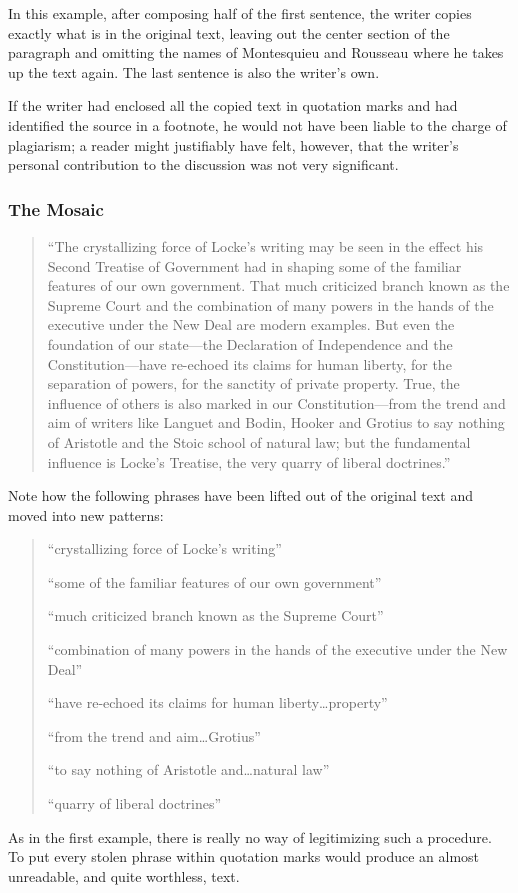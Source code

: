 In this example, after composing half of the first sentence, the writer copies exactly what is in the original text, leaving out the center section of the paragraph and omitting the names of Montesquieu and Rousseau where he takes up the text again. The last sentence is also the writer’s own.

If the writer had enclosed all the copied text in quotation marks and had identified the source in a footnote, he would not have been liable to the charge of plagiarism; a reader might justifiably have felt, however, that the writer’s personal contribution to the discussion was not very significant.

\subsubsection{The Mosaic}

\begin{quote}“The crystallizing force of Locke’s writing may be seen in the effect his Second Treatise of Government had in shaping some of the familiar features of our own government. That much criticized branch known as the Supreme Court and the combination of many powers in the hands of the executive under the New Deal are modern examples. But even the foundation of our state—the Declaration of Independence and the Constitution—have re-echoed its claims for human liberty, for the separation of powers, for the sanctity of private property. True, the influence of others is also marked in our Constitution—from the trend and aim of writers like Languet and Bodin, Hooker and Grotius to say nothing of Aristotle and the Stoic school of natural law; but the fundamental influence is Locke’s Treatise, the very quarry of liberal doctrines.”
\end{quote}

Note how the following phrases have been lifted out of the original text and moved into new patterns:
\begin{quote}
“crystallizing force of Locke’s writing”

“some of the familiar features of our own government”

“much criticized branch known as the Supreme Court”

“combination of many powers in the hands of the executive under the New Deal”

“have re-echoed its claims for human liberty…property”

“from the trend and aim…Grotius”

“to say nothing of Aristotle and…natural law”

“quarry of liberal doctrines”
\end{quote}
As in the first example, there is really no way of legitimizing such a procedure. To put every stolen phrase within quotation marks would produce an almost unreadable, and quite worthless, text.

